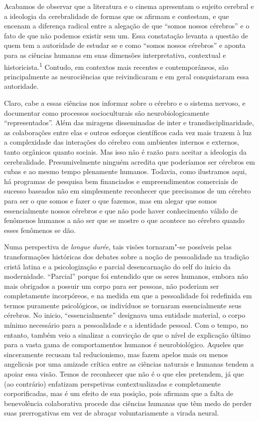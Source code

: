 Acabamos de observar que a literatura e o cinema apresentam o sujeito
cerebral e a ideologia da cerebralidade de formas que os afirmam e
contestam, e que encenam a diferença radical entre a alegação de que
``somos nossos cérebros'' e o fato de que não podemos existir sem um.
Essa constatação levanta a questão de quem tem a autoridade de estudar
se e como ``somos nossos cérebros'' e aponta para as ciências humanas em
suas dimensões interpretativa, contextual e
historicista.\textsuperscript{1} Contudo, em contextos mais recentes e
contemporâneos, são principalmente as neurociências que reivindicaram e
em geral conquistaram essa autoridade.

Claro, cabe a essas ciências nos informar sobre o cérebro e o sistema
nervoso, e documentar como processos socioculturais são
neurobiologicamente ``representados''. Além das miragens disseminadas de
inter e transdisciplinaridade, as colaborações entre elas e outros
esforços científicos cada vez mais trazem à luz a complexidade das
interações do cérebro com ambientes internos e externos, tanto orgânicos
quanto sociais. Mas isso não é razão para aceitar a ideologia da
cerebralidade. Presumivelmente ninguém acredita que poderíamos ser
cérebros em cubas e ao mesmo tempo plenamente humanos. Todavia, como
ilustramos aqui, há programas de pesquisa bem financiados e
empreendimentos comerciais de sucesso baseados não em simplesmente
reconhecer que precisamos de um cérebro para ser o que somos e fazer o
que fazemos, mas em alegar que somos essencialmente nossos cérebros e
que não pode haver conhecimento válido de fenômenos humanos a não ser
que se mostre o que acontece no cérebro quando esses fenômenos se dão.

Numa perspectiva de \emph{longue durée}, tais visões tornaram"-se
possíveis pelas transformações históricas dos debates sobre a noção de
pessoalidade na tradição cristã latina e a psicologização e parcial
desencarnação do self do início da modernidade. ``Parcial'' porque foi
entendido que os seres humanos, embora não mais obrigados a possuir um
corpo para ser pessoas, não poderiam ser completamente incorpóreos, e na
medida em que a pessoalidade foi redefinida em termos puramente
psicológicos, os indivíduos se tornaram essencialmente seus cérebros. No
inicio, ``essencialmente'' designava uma entidade material, o corpo
mínimo necessário para a pessoalidade e a identidade pessoal. Com o
tempo, no entanto, também veio a sinalizar a convicção de que o nível de
explicação último para a vasta gama de comportamentos humanos é
neurobiológico. Aqueles que sinceramente recusam tal reducionismo, mas
fazem apelos mais ou menos angelicais por uma amizade crítica entre as
ciências naturais e humanas tendem a apoiar essa visão. Temos de
reconhecer que não é o que eles pretendem, já que (ao contrário)
enfatizam perspetivas contextualizadas e completamente corporificadas,
mas é um efeito de sua posição, pois afirmam que a falta de benevolência
colaborativa procede das ciências humanas que têm medo de perder suas
prerrogativas em vez de abraçar voluntariamente a virada neural.

